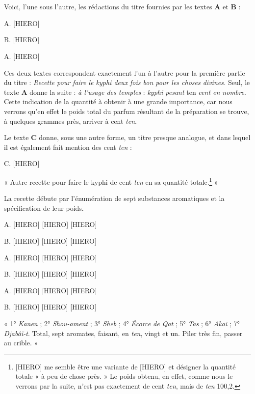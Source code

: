 \documentclass[a4paper, 11pt, oneside]{article}
\begin{document}
\section{}
\paragraph{}
Voici, l'une sous l'autre, les rédactions du titre fournies par les textes \textbf{A} et \textbf{B} :

A. [HIERO]

B. [HIERO]

A. [HIERO]

Ces deux textes correspondent exactement l'un à l'autre pour la première partie du titre : \emph{Recette pour faire le kyphi deux fois bon pour les choses divines.} Seul, le texte \textbf{A} donne la suite : \emph{à l'usage des temples} : \emph{kyphi pesant} ten \emph{cent en nombre}. Cette indication de la quantité à obtenir à une grande importance, car nous verrons qu'en effet le poids total du parfum résultant de la préparation se trouve, à quelques grammes près, arriver à cent \emph{ten}. 

Le texte \textbf{C} donne, sous une autre forme, un titre presque analogue, et dans lequel il est également fait mention des cent \emph{ten} :

C. [HIERO]

« Autre recette pour faire le kyphi de cent \emph{ten} en sa quantité totale.\footnote{[HIERO] me semble être une variante de [HIERO] et désigner la quantité totale « à peu de chose près. » Le poids obtenu, en effet, comme nous le verrons par la suite, n'est pas exactement de cent \emph{ten}, mais de \emph{ten} 100,2.} »

La recette débute par l'énumération de sept substances aromatiques et la spécification de leur poids.

A. [HIERO] [HIERO] [HIERO]

B. [HIERO] [HIERO] [HIERO]

A. [HIERO] [HIERO] [HIERO]

B. [HIERO] [HIERO] [HIERO]

A. [HIERO] [HIERO] [HIERO]

B. [HIERO] [HIERO] [HIERO]

« 1° \emph{Kanen} ; 2° \emph{Shou-ament} ; 3° \emph{Sheb} ; 4° \emph{Écorce de Qat} ; 5° \emph{Tas} ; 6° \emph{Akaï} ; 7° \emph{Djabâï-t}. Total, sept aromates, faisant, en \emph{ten}, vingt et un. Piler très fin, passer au crible. »
\end{document}
